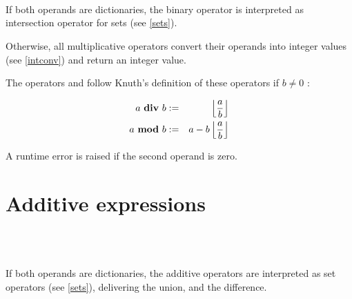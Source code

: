 \begin{grammar}
      \produces {} \\
      \produces {}
         \lextoken{$*$}  \\
      \produces {}
           \\
      \produces {}
          
\end{grammar}

\noindent
If both operands are dictionaries, the binary operator \token{$*$}
is interpreted as intersection
operator for sets (see \ref{sets}).

Otherwise, all multiplicative operators convert their operands into integer
values (see \ref{intconv}) and return an integer value.

The operators  and  follow
Knuth's definition of these operators if $b \not= 0$ \cite{Knuth:divmod}:

\begin{eqnarray*}
   a ~ \mbox{\keyword{div}} ~ b & := &
      \left\lfloor \frac{a}{b} \right\rfloor \\
   a ~ \mbox{\keyword{mod}} ~ b & := &
      a - b \left\lfloor \frac{a}{b} \right\rfloor
\end{eqnarray*}

\noindent
A runtime error is raised if the second operand is zero.

\section{Additive expressions}

\begin{grammar}
      \produces {} \\
      \produces {}
         \lextoken{$+$}  \\
      \produces {}
         \lextoken{$-$} 
\end{grammar}

\noindent
If both operands are dictionaries, the additive operators
are interpreted as set operators (see \ref{sets}),
\token{+} delivering the union,
and \token{$-$} the difference.

